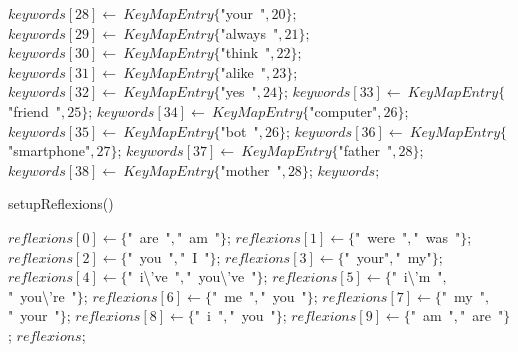 \documentclass[a4paper,10pt]{article}
\begin{document}
\begin{algorithm}
\begin{algorithmic}[5]
  \STATE \(keywords[28]\gets\ KeyMapEntry\{\)"{}your\ "{}\(,20\}\);
  \STATE \(keywords[29]\gets\ KeyMapEntry\{\)"{}always\ "{}\(,21\}\);
  \STATE \(keywords[30]\gets\ KeyMapEntry\{\)"{}think\ "{}\(,22\}\);
  \STATE \(keywords[31]\gets\ KeyMapEntry\{\)"{}alike\ "{}\(,23\}\);
  \STATE \(keywords[32]\gets\ KeyMapEntry\{\)"{}yes\ "{}\(,24\}\);
  \STATE \(keywords[33]\gets\ KeyMapEntry\{\)"{}friend\ "{}\(,25\}\);
  \STATE \(keywords[34]\gets\ KeyMapEntry\{\)"{}computer"{}\(,26\}\);
  \STATE \(keywords[35]\gets\ KeyMapEntry\{\)"{}bot\ "{}\(,26\}\);
  \STATE \(keywords[36]\gets\ KeyMapEntry\{\)"{}smartphone"{}\(,27\}\);
  \STATE \(keywords[37]\gets\ KeyMapEntry\{\)"{}father\ "{}\(,28\}\);
  \STATE \(keywords[38]\gets\ KeyMapEntry\{\)"{}mother\ "{}\(,28\}\);
  \RETURN\(keywords\);

\end{algorithmic}
\end{algorithm}


\begin{algorithm}
\caption{setupReflexions()}
\begin{algorithmic}[5]

\STATE {}
  \STATE \(reflexions[0]\gets\{\)"{}\ are\ "{}\(,\)"{}\ am\ "{}\(\}\);
  \STATE \(reflexions[1]\gets\{\)"{}\ were\ "{}\(,\)"{}\ was\ "{}\(\}\);
  \STATE \(reflexions[2]\gets\{\)"{}\ you\ "{}\(,\)"{}\ I\ "{}\(\}\);
  \STATE \(reflexions[3]\gets\{\)"{}\ your"{}\(,\)"{}\ my"{}\(\}\);
  \STATE \(reflexions[4]\gets\{\)"{}\ i\textbackslash{}'{}ve\ "{}\(,\)"{}\ you\textbackslash{}'{}ve\ "{}\(\}\);
  \STATE \(reflexions[5]\gets\{\)"{}\ i\textbackslash{}'{}m\ "{}\(,\)"{}\ you\textbackslash{}'{}re\ "{}\(\}\);
  \STATE \(reflexions[6]\gets\{\)"{}\ me\ "{}\(,\)"{}\ you\ "{}\(\}\);
  \STATE \(reflexions[7]\gets\{\)"{}\ my\ "{}\(,\)"{}\ your\ "{}\(\}\);
  \STATE \(reflexions[8]\gets\{\)"{}\ i\ "{}\(,\)"{}\ you\ "{}\(\}\);
  \STATE \(reflexions[9]\gets\{\)"{}\ am\ "{}\(,\)"{}\ are\ "{}\(\}\);
  \RETURN\(reflexions\);

\end{algorithmic}
\end{algorithm}
\end{document}
